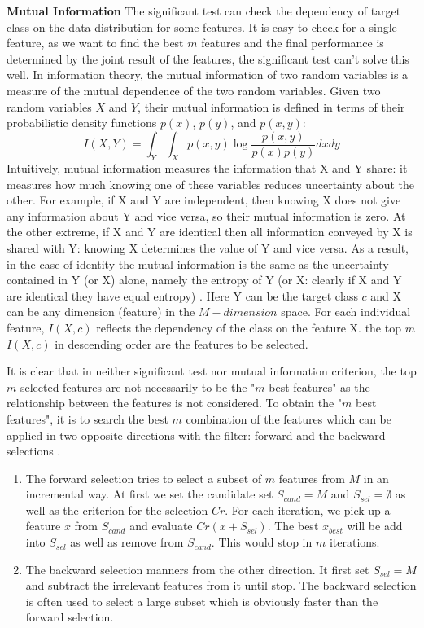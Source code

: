 \textbf{Mutual Information}
The significant test can check the dependency of target class on the data distribution for some features. It is easy to check for a single feature, as we want to find the best $m$ features and the final performance is determined by the joint result of the features, the significant test can't solve this well. In information theory, the mutual information of two random variables is a measure of the mutual dependence of the two random variables. Given two random variables $X$ and $Y$, their mutual information is defined in terms of their probabilistic density functions $p(x)$, $p(y)$, and $p(x,y)$:
\begin{equation}\label{mutualinfor}
  I(X,Y) = \int_Y {\int_X {p(x,y)\log \frac{{p(x,y)}}{{p(x)p(y)}}dx} dy}
\end{equation}
Intuitively, mutual information measures the information that X and Y share: it measures how much knowing one of these variables reduces uncertainty about the other. For example, if X and Y are independent, then knowing X does not give any information about Y and vice versa, so their mutual information is zero. At the other extreme, if X and Y are identical then all information conveyed by X is shared with Y: knowing X determines the value of Y and vice versa. As a result, in the case of identity the mutual information is the same as the uncertainty contained in Y (or X) alone, namely the entropy of Y (or X: clearly if X and Y are identical they have equal entropy) \cite{mackay2003information}. Here Y can be the target class $c$ and X can be any dimension (feature) in the $M-dimension$ space. For each individual feature, $I(X,c)$ reflects the dependency of the class on the feature X. the top $m$ $I(X,c)$ in descending order are the features to be selected.

It is clear that in neither significant test nor mutual information criterion, the top $m$ selected features are not necessarily to be the "$m$ best features" as the relationship between the features is not considered. To obtain the "$m$ best features", it is to search the best $m$ combination of the features which can be applied in two opposite directions with the filter: forward  and the backward selections \cite{peng2005feature}.
\begin{enumerate}
  \item The forward selection tries to select a subset of $m$ features from $M$ in an incremental way. At first we set the candidate set $S_{cand}=M$ and $S_{sel} = \emptyset$ as well as the criterion for the selection $Cr$. For each iteration, we pick up a feature $x$ from $S_{cand}$ and evaluate $Cr(x+S_{sel})$. The best $x_{best}$ will be add into $S_{sel}$ as well as remove from $S_{cand}$. This would stop in $m$ iterations.
  \item The backward selection manners from the other direction. It first set $S_{sel} = M$ and subtract the irrelevant features from it until stop. The backward selection is often used to select a large subset which is obviously faster than the forward selection.
\end{enumerate}

